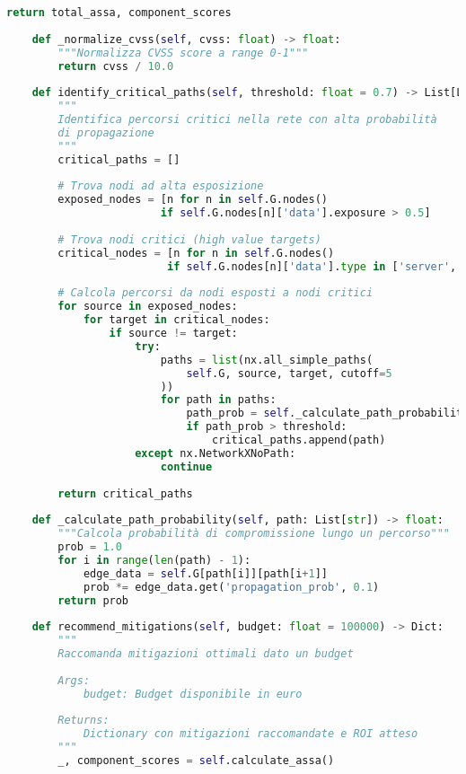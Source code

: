 \begin{lstlisting}[language=Python, caption=Implementazione dell'algoritmo ASSA-GDO]
        return total_assa, component_scores
    
    def _normalize_cvss(self, cvss: float) -> float:
        """Normalizza CVSS score a range 0-1"""
        return cvss / 10.0
    
    def identify_critical_paths(self, threshold: float = 0.7) -> List[List[str]]:
        """
        Identifica percorsi critici nella rete con alta probabilità
        di propagazione
        """
        critical_paths = []
        
        # Trova nodi ad alta esposizione
        exposed_nodes = [n for n in self.G.nodes() 
                        if self.G.nodes[n]['data'].exposure > 0.5]
        
        # Trova nodi critici (high value targets)
        critical_nodes = [n for n in self.G.nodes()
                         if self.G.nodes[n]['data'].type in ['server', 'database']]
        
        # Calcola percorsi da nodi esposti a nodi critici
        for source in exposed_nodes:
            for target in critical_nodes:
                if source != target:
                    try:
                        paths = list(nx.all_simple_paths(
                            self.G, source, target, cutoff=5
                        ))
                        for path in paths:
                            path_prob = self._calculate_path_probability(path)
                            if path_prob > threshold:
                                critical_paths.append(path)
                    except nx.NetworkXNoPath:
                        continue
                        
        return critical_paths
    
    def _calculate_path_probability(self, path: List[str]) -> float:
        """Calcola probabilità di compromissione lungo un percorso"""
        prob = 1.0
        for i in range(len(path) - 1):
            edge_data = self.G[path[i]][path[i+1]]
            prob *= edge_data.get('propagation_prob', 0.1)
        return prob
    
    def recommend_mitigations(self, budget: float = 100000) -> Dict:
        """
        Raccomanda mitigazioni ottimali dato un budget
        
        Args:
            budget: Budget disponibile in euro
            
        Returns:
            Dictionary con mitigazioni raccomandate e ROI atteso
        """
        _, component_scores = self.calculate_assa()
        

\end{lstlisting}
